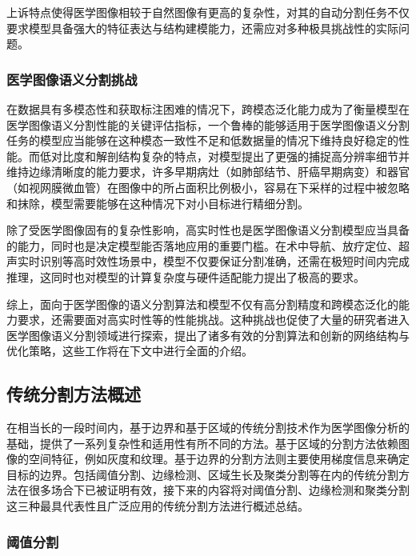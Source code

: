 
上诉特点使得医学图像相较于自然图像有更高的复杂性，对其的自动分割任务不仅要求模型具备强大的特征表达与结构建模能力，还需应对多种极具挑战性的实际问题。

\subsubsection{医学图像语义分割挑战}

在数据具有多模态性和获取标注困难的情况下，跨模态泛化能力成为了衡量模型在医学图像语义分割性能的关键评估指标，一个鲁棒的能够适用于医学图像语义分割任务的模型应当能够在这种模态一致性不足和低数据量的情况下维持良好稳定的性能。而低对比度和解剖结构复杂的特点，对模型提出了更强的捕捉高分辨率细节并维持边缘清晰度的能力要求，许多早期病灶（如肺部结节、肝癌早期病变）和器官（如视网膜微血管）在图像中的所占面积比例极小，容易在下采样的过程中被忽略和抹除，模型需要能够在这种情况下对小目标进行精细分割。

除了受医学图像固有的复杂性影响，高实时性也是医学图像语义分割模型应当具备的能力，同时也是决定模型能否落地应用的重要门槛。在术中导航、放疗定位、超声实时识别等高时效性场景中，模型不仅要保证分割准确，还需在极短时间内完成推理，这同时也对模型的计算复杂度与硬件适配能力提出了极高的要求。

综上，面向于医学图像的语义分割算法和模型不仅有高分割精度和跨模态泛化的能力要求，还需要面对高实时性等的性能挑战。这种挑战也促使了大量的研究者进入医学图像语义分割领域进行探索，提出了诸多有效的分割算法和创新的网络结构与优化策略，这些工作将在下文中进行全面的介绍。

\subsection{传统分割方法概述}

在相当长的一段时间内，基于边界和基于区域的传统分割技术作为医学图像分析的基础，提供了一系列复杂性和适用性有所不同的方法。基于区域的分割方法依赖图像的空间特征，例如灰度和纹理。基于边界的分割方法则主要使用梯度信息来确定目标的边界。包括阈值分割、边缘检测、区域生长及聚类分割等在内的传统分割方法在很多场合下已被证明有效\cite{xu2024}，接下来的内容将对阈值分割、边缘检测和聚类分割这三种最具代表性且广泛应用的传统分割方法进行概述总结。

\subsubsection{阈值分割}

